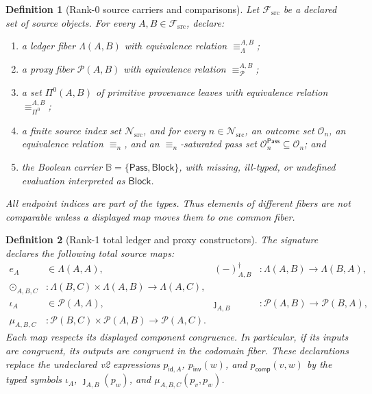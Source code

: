 \documentclass[11pt]{article}
\newtheorem{definition}{Definition}
\newcommand{\Block}{\mathsf{Block}}
\newcommand{\Pass}{\mathsf{Pass}}
\begin{document}
\begin{definition}[Rank-0 source carriers and comparisons]
Let \(\mathcal F_{\mathrm{src}}\) be a declared set of source objects. For
every \(A,B\in\mathcal F_{\mathrm{src}}\), declare:
\begin{enumerate}[leftmargin=*]
  \item a ledger fiber \(\Lambda(A,B)\) with equivalence relation
  \(\equiv_{\Lambda}^{A,B}\);
  \item a proxy fiber \(\mathcal P(A,B)\) with equivalence relation
  \(\equiv_{\mathcal P}^{A,B}\);
  \item a set \(\Pi^0(A,B)\) of primitive provenance leaves with equivalence
  relation \(\equiv_{\Pi^0}^{A,B}\);
  \item a finite source index set \(\mathcal N_{\mathrm{src}}\), and for every
  \(n\in\mathcal N_{\mathrm{src}}\), an outcome set \(\mathcal O_n\), an
  equivalence relation \(\equiv_n\), and an
  \(\equiv_n\)-saturated pass set \(\mathcal O_n^{\Pass}\subseteq\mathcal O_n\);
  and
  \item the Boolean carrier \(\mathbb B=\{\Pass,\Block\}\), with missing,
  ill-typed, or undefined evaluation interpreted as \(\Block\).
\end{enumerate}
All endpoint indices are part of the types. Thus elements of different fibers
are not comparable unless a displayed map moves them to one common fiber.
\end{definition}

\begin{definition}[Rank-1 total ledger and proxy constructors]
The signature declares the following total source maps:
\[
\begin{aligned}
 e_A&\in\Lambda(A,A),&
 (-)^\dagger_{A,B}&:\Lambda(A,B)\longrightarrow\Lambda(B,A),\\
 \odot_{A,B,C}&:\Lambda(B,C)\times\Lambda(A,B)
                 \longrightarrow\Lambda(A,C),\\[2mm]
 \iota_A&\in\mathcal P(A,A),&
 \jmath_{A,B}&:\mathcal P(A,B)\longrightarrow\mathcal P(B,A),\\
 \mu_{A,B,C}&:\mathcal P(B,C)\times\mathcal P(A,B)
                 \longrightarrow\mathcal P(A,C).
\end{aligned}
\]
Each map respects its displayed component congruence. In particular, if its
inputs are congruent, its outputs are congruent in the codomain fiber. These
declarations replace the undeclared v2 expressions
\(p_{\mathsf{id},A}\), \(p_{\mathsf{inv}}(w)\), and
\(p_{\mathsf{comp}}(v,w)\) by the typed symbols
\(\iota_A\), \(\jmath_{A,B}(p_w)\), and
\(\mu_{A,B,C}(p_v,p_w)\).
\end{definition}
\end{document}
